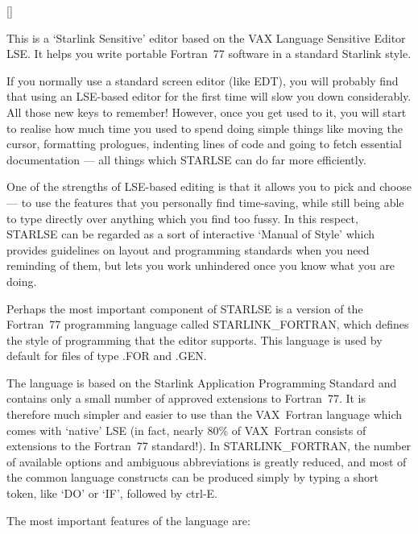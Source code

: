 \vspace{-10mm}

\hfill []

\vspace{2mm}

This is a `Starlink Sensitive' editor based on the \mbox{VAX} Language
Sensitive Editor \mbox{LSE}.
It helps you write portable Fortran~77 software in a standard Starlink style.

If you normally use a standard screen editor (like EDT), you will probably find
that using an \mbox{LSE}-based editor for the first time will slow you down
considerably. 
All those new keys to remember!
However, once you get used to it, you will start to realise how much time
you used to spend doing simple things like moving the cursor, formatting
prologues, indenting lines of code and going to fetch essential
documentation --- all things which \mbox{STARLSE} can do far more
efficiently. 

One of the strengths of \mbox{LSE}-based editing is that it allows
you to pick and choose --- to use the features that you personally find
time-saving, while still being able to type directly over anything which you
find too fussy. 
In this respect, \mbox{STARLSE} can be regarded as a sort of interactive
`Manual of Style' which provides guidelines on layout and programming
standards when you need reminding of them, but lets you work unhindered once
you know what you are doing. 

Perhaps the most important component of \mbox{STARLSE} is a version of the
Fortran~77 programming language called \mbox{STARLINK\_FORTRAN}, which
defines the style of programming that the editor supports. 
This language is used by default for files of type \mbox{.FOR} and
\mbox{.GEN}. 

The language is based on the Starlink Application Programming Standard and
contains only a small number of approved extensions to Fortran~77.
It is therefore much simpler and easier to use than the \mbox{VAX}~Fortran
language which comes with `native' \mbox{LSE} (in fact, nearly 80\% of
\mbox{VAX}~Fortran consists of extensions to the Fortran~77 standard!). 
In \mbox{STARLINK\_FORTRAN}, the number of available options and ambiguous
abbreviations is greatly reduced, and most of the common language constructs
can be produced simply by typing a short token, like `DO' or `IF', followed
by \mbox{ctrl-E}. 

The most important features of the language are:

